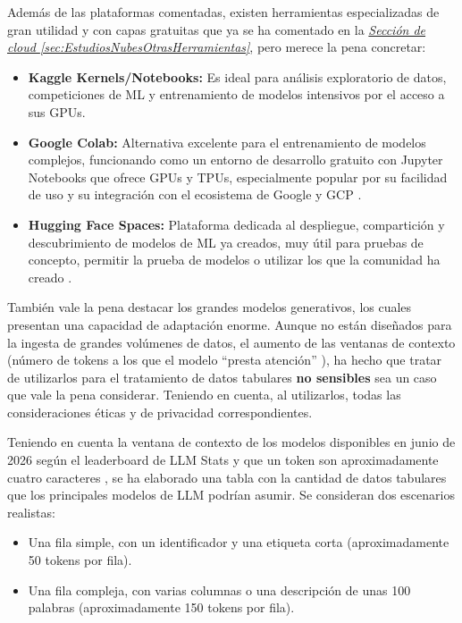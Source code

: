 Además de las plataformas comentadas, existen herramientas especializadas de gran utilidad y con capas gratuitas que ya se ha comentado en la \hyperref[sec:EstudiosNubesOtrasHerramientas]{\textit{Sección de cloud \ref*{sec:EstudiosNubesOtrasHerramientas}}}, pero merece la pena concretar:

\begin{itemize}
	\item \textbf{Kaggle Kernels/Notebooks:} Es ideal para análisis exploratorio de datos, competiciones de ML y entrenamiento de modelos intensivos \citep{Kaggle_CloudIA} por el acceso a sus GPUs.
	\item \textbf{Google Colab:} Alternativa excelente para el entrenamiento de modelos complejos, funcionando como un entorno de desarrollo gratuito con Jupyter Notebooks que ofrece GPUs y TPUs, especialmente popular por su facilidad de uso y su integración con el ecosistema de Google y GCP \citep{GoogleColab_CloudIA}.
	\item \textbf{Hugging Face Spaces:} Plataforma dedicada al despliegue, compartición y descubrimiento de modelos de ML ya creados, muy útil para pruebas de concepto, permitir la prueba de modelos o utilizar los que la comunidad ha creado \citep{huggingfaceSpaces_CloudIA}.
\end{itemize}

También vale la pena destacar los grandes modelos generativos, los cuales presentan una capacidad de adaptación enorme. Aunque no están diseñados para la ingesta de grandes volúmenes de datos, el aumento de las ventanas de contexto (número de tokens a los que el modelo ``presta atención'' \citep{vaswani2017attention}), ha hecho que tratar de utilizarlos para el tratamiento de datos tabulares \textbf{no sensibles} sea un caso que vale la pena considerar. Teniendo en cuenta, al utilizarlos, todas las consideraciones éticas y de privacidad correspondientes.

Teniendo en cuenta la ventana de contexto de los modelos disponibles en junio de 2026 según el leaderboard de LLM Stats \citep{LLMLeaderboardParameters} y que un token son aproximadamente cuatro caracteres \citep{TokenizacionMicrosoft}, se ha elaborado una tabla con la cantidad de datos tabulares que los principales modelos de LLM podrían asumir. Se consideran dos escenarios realistas:

\begin{itemize}
	\item Una fila simple, con un identificador y una etiqueta corta (aproximadamente 50 tokens por fila).
	\item Una fila compleja, con varias columnas o una descripción de unas 100 palabras (aproximadamente 150 tokens por fila).
\end{itemize}

